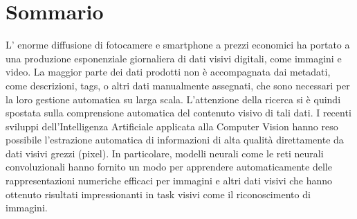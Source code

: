 \chapter*{Sommario}
\lettrine{L'}{} enorme diffusione di fotocamere e smartphone a prezzi economici ha portato a una produzione esponenziale giornaliera di dati visivi digitali, come immagini e video.
La maggior parte dei dati prodotti non è accompagnata dai metadati, come descrizioni, tags, o altri dati manualmente assegnati, che sono necessari per la loro gestione automatica su larga scala.
L'attenzione della ricerca si è quindi spostata sulla comprensione automatica del contenuto visivo di tali dati.
I recenti sviluppi dell'Intelligenza Artificiale applicata alla Computer Vision hanno reso possibile l'estrazione automatica di informazioni di alta qualità direttamente da dati visivi grezzi (pixel).
In particolare, modelli neurali come le reti neurali convoluzionali hanno fornito un modo per apprendere automaticamente delle rappresentazioni numeriche efficaci per immagini e altri dati visivi che hanno ottenuto risultati impressionanti in task visivi come il riconoscimento di immagini.

